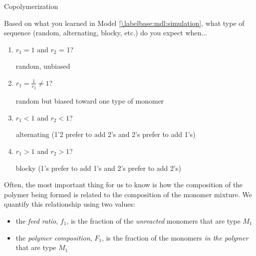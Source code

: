 \begin{activity}{Copolymerization}
\begin{ctqs}
	\question Based on what you learned in Model \ref{\labelbase:mdl:simulation}, what type of sequence (random, alternating, blocky, etc.) do you expect when...
	
		\begin{enumerate}
			\item $r_1 = 1$ and $r_2$ = 1?
			
				\begin{solution}[0.5in]
					random, unbiased
				\end{solution}
			
			\item $r_1 = \frac{1}{r_2} \neq 1$?
			
				\begin{solution}[0.5in]
					random but biased toward one type of monomer
				\end{solution}
			
			\item $r_1 < 1$ and $r_2 < 1$?
			
				\begin{solution}[0.5in]
					alternating (1'2 prefer to add 2's and 2's prefer to add 1's)
				\end{solution}
			
			\item $r_1 > 1$ and $r_2 > 1$?
			
				\begin{solution}[0.5in]
					blocky (1's prefer to add 1's and 2's prefer to add 2's)
				\end{solution}
		\end{enumerate}

\end{ctqs}

\vspace{0.5in}
\begin{model}
	\label{\labelbase:mdl:feedratios}
	
	Often, the most important thing for us to know is how the composition of the polymer being formed is related to the composition of the monomer mixture.  We quantify this relationship using two values:
	\begin{itemize}
		\item the \emph{feed ratio}, $f_1$, is the fraction of the \emph{unreacted} monomers that are type $M_1$
		\item the \emph{polymer composition}, $F_1$, is the fraction of  the monomers \emph{in the polymer} that are type $M_1$
	\end{itemize}
	

\end{model}
\end{activity}
